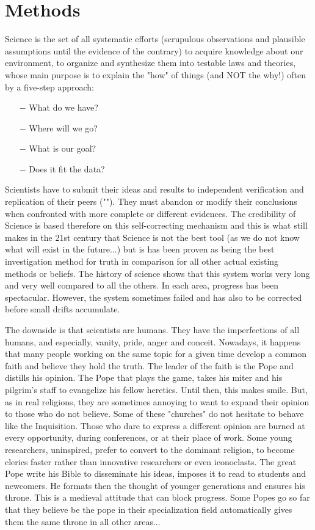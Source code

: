 	\section{Methods}	
	Science is the set of all systematic efforts (scrupulous observations and plausible assumptions until the evidence of the contrary) to acquire knowledge about our environment, to organize and synthesize them into testable laws and theories, whose main purpose is to explain the "how" of things (and NOT the why!) often by a five-step approach:
	\begin{itemize}
		\item[$-$] What do we have?
		\item[$-$] Where will we go?
		\item[$-$] What is our goal?	
		\item[$-$] Does it fit the data?
	\end{itemize}
	Scientists have to submit their ideas and results to independent verification and replication of their peers (""). They must abandon or modify their conclusions when confronted with more complete or different evidences. The credibility of Science is based therefore on this self-correcting mechanism and this is what still makes in the 21st century that Science is not the best tool (as we do not know what will exist in the future...) but is has been proven as being the best investigation method for truth in comparison for all other actual existing methods or beliefs. The history of science shows that this system works very long and very well compared to all the others. In each area, progress has been spectacular. However, the system sometimes failed and has also to be corrected before small drifts accumulate.

	The downside is that scientists are humans. They have the imperfections of all humans, and especially, vanity, pride, anger and conceit. Nowadays, it happens that many people working on the same topic for a given time develop a common faith and believe they hold the truth. The leader of the faith is the Pope and distills his opinion. The Pope that plays the game, takes his miter and his pilgrim's staff to evangelize his fellow heretics. Until then, this makes smile. But, as in real religions, they are sometimes annoying to want to expand their opinion to those who do not believe. Some of these "churches" do not hesitate to behave like the Inquisition. Those who dare to express a different opinion are burned at every opportunity, during conferences, or at their place of work. Some young researchers, uninspired, prefer to convert to the dominant religion, to become clerics faster rather than innovative researchers or even iconoclasts. The great Pope write his Bible to disseminate his ideas, imposes it to read to students and newcomers. He formats then the thought of younger generations and ensures his throne. This is a medieval attitude that can block progress. Some Popes go so far that they believe be the pope in their specialization field automatically gives them the same throne in all other areas...

